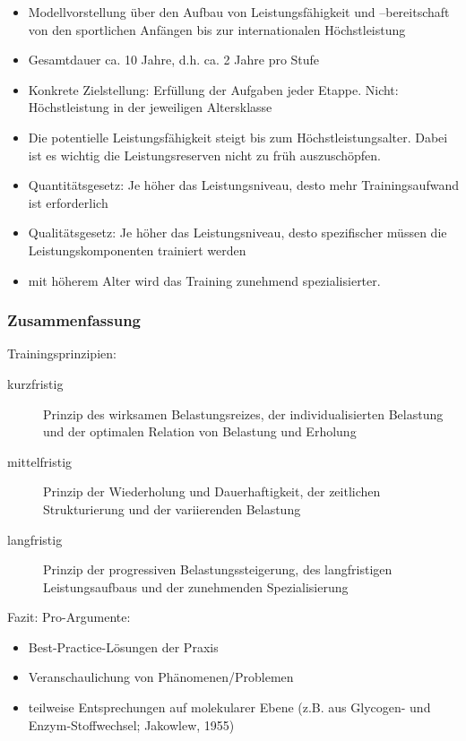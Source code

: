 \begin{itemize}
    \item Modellvorstellung über den Aufbau von Leistungsfähigkeit und –bereitschaft von den sportlichen Anfängen bis zur internationalen Höchstleistung
    \item Gesamtdauer ca. 10 Jahre, d.h. ca. 2 Jahre pro Stufe
    \item Konkrete Zielstellung: Erfüllung der Aufgaben jeder Etappe. Nicht: Höchstleistung in der jeweiligen Altersklasse
    \item Die potentielle Leistungsfähigkeit steigt bis zum Höchstleistungsalter. Dabei ist es wichtig die Leistungsreserven nicht zu früh auszuschöpfen.
    \item Quantitätsgesetz: Je höher das Leistungsniveau, desto mehr Trainingsaufwand ist erforderlich
    \item Qualitätsgesetz: Je höher das Leistungsniveau, desto spezifischer müssen die Leistungskomponenten trainiert werden
    \item mit höherem Alter wird das Training zunehmend spezialisierter.
\end{itemize}

\subsubsection{Zusammenfassung}

Trainingsprinzipien:
\begin{description}
    \item[kurzfristig] Prinzip des wirksamen Belastungsreizes, der individualisierten Belastung und der optimalen Relation von Belastung und Erholung
    \item [mittelfristig] Prinzip der Wiederholung und Dauerhaftigkeit, der  zeitlichen Strukturierung und der variierenden Belastung
    \item [langfristig] Prinzip der progressiven Belastungssteigerung, des langfristigen Leistungsaufbaus und der zunehmenden Spezialisierung
\end{description}

Fazit: Pro-Argumente:
\begin{itemize}
    \item Best-Practice-Lösungen der Praxis
    \item Veranschaulichung von Phänomenen/Problemen
    \item teilweise Entsprechungen auf molekularer Ebene (z.B. aus Glycogen- und Enzym-Stoffwechsel; Jakowlew, 1955)
\end{itemize}

